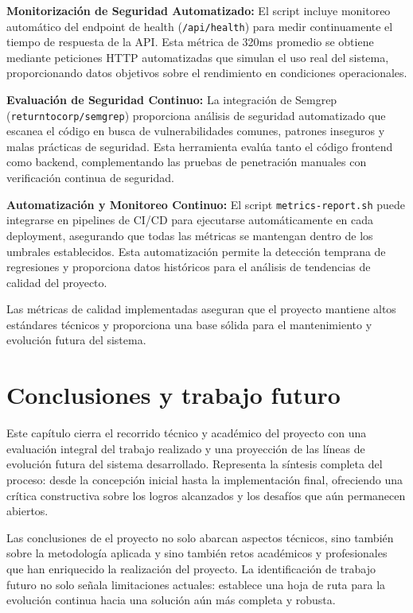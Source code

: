 \documentclass[12pt,a4paper,oneside]{report}
\begin{document}
\textbf{Monitorización de Seguridad Automatizado:} El script incluye monitoreo automático del endpoint de health (\texttt{/api/health}) para medir continuamente el tiempo de respuesta de la API. Esta métrica de 320ms promedio se obtiene mediante peticiones HTTP automatizadas que simulan el uso real del sistema, proporcionando datos objetivos sobre el rendimiento en condiciones operacionales.

\textbf{Evaluación de Seguridad Continuo:} La integración de Semgrep (\texttt{returntocorp/semgrep}) proporciona análisis de seguridad automatizado que escanea el código en busca de vulnerabilidades comunes, patrones inseguros y malas prácticas de seguridad. Esta herramienta evalúa tanto el código frontend como backend, complementando las pruebas de penetración manuales con verificación continua de seguridad.

\textbf{Automatización y Monitoreo Continuo:} El script \texttt{metrics-report.sh} puede integrarse en pipelines de CI/CD para ejecutarse automáticamente en cada deployment, asegurando que todas las métricas se mantengan dentro de los umbrales establecidos. Esta automatización permite la detección temprana de regresiones y proporciona datos históricos para el análisis de tendencias de calidad del proyecto.

Las métricas de calidad implementadas aseguran que el proyecto mantiene altos estándares técnicos y proporciona una base sólida para el mantenimiento y evolución futura del sistema.

\chapter{Conclusiones y trabajo
futuro}\label{conclusiones-y-trabajo-futuro}
Este capítulo cierra el recorrido técnico y académico del proyecto con una evaluación integral del trabajo realizado y una proyección de las líneas de evolución futura del sistema desarrollado. Representa la síntesis completa del proceso: desde la concepción inicial hasta la implementación final, ofreciendo una crítica constructiva sobre los logros alcanzados y los desafíos que aún permanecen abiertos.

Las conclusiones de el proyecto no solo abarcan aspectos técnicos, sino también sobre la metodología aplicada y sino también retos académicos y profesionales que han enriquecido la realización del proyecto. La identificación de trabajo futuro no solo señala limitaciones actuales: establece una hoja de ruta para la evolución continua hacia una solución aún más completa y robusta.
\end{document}
